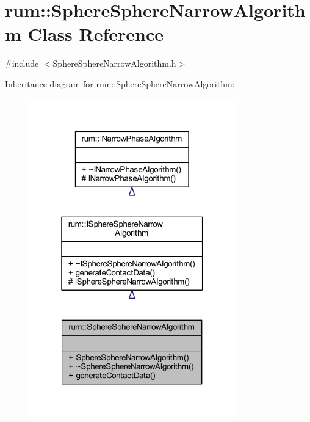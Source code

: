 \hypertarget{classrum_1_1_sphere_sphere_narrow_algorithm}{}\section{rum\+:\+:Sphere\+Sphere\+Narrow\+Algorithm Class Reference}
\label{classrum_1_1_sphere_sphere_narrow_algorithm}


{\ttfamily \#include $<$Sphere\+Sphere\+Narrow\+Algorithm.\+h$>$}



Inheritance diagram for rum\+:\+:Sphere\+Sphere\+Narrow\+Algorithm\+:\nopagebreak
\begin{figure}[H]
\begin{center}
\leavevmode
\includegraphics[width=253pt]{classrum_1_1_sphere_sphere_narrow_algorithm__inherit__graph}
\end{center}
\end{figure}


